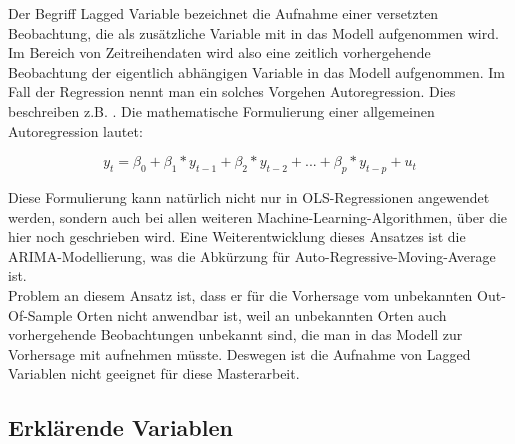 \documentclass[a4paper,12pt]{thesis}
\begin{document}
Der Begriff Lagged Variable bezeichnet die Aufnahme einer versetzten Beobachtung, die als zusätzliche Variable mit in das Modell aufgenommen wird. Im Bereich von Zeitreihendaten wird also eine zeitlich vorhergehende Beobachtung der eigentlich abhängigen Variable in das Modell aufgenommen. Im Fall der Regression nennt man ein solches Vorgehen Autoregression. Dies beschreiben z.B. \cite{Stock2015a}. Die mathematische Formulierung einer allgemeinen Autoregression lautet:

\begin{equation}
	\label{SVM:Autoregression}
	y_t = \beta_0 + \beta_1 * y_{t-1} + \beta_2 * y_{t-2} + ... + \beta_p * y_{t-p} + u_t
\end{equation}

Diese Formulierung kann natürlich nicht nur in OLS-Regressionen angewendet werden, sondern auch bei allen weiteren Machine-Learning-Algorithmen, über die hier noch geschrieben wird. Eine Weiterentwicklung dieses Ansatzes ist die ARIMA-Modellierung, was die Abkürzung für Auto-Regressive-Moving-Average ist.\\
Problem an diesem Ansatz ist, dass er für die Vorhersage vom unbekannten Out-Of-Sample Orten nicht anwendbar ist, weil an unbekannten Orten auch vorhergehende Beobachtungen unbekannt sind, die man in das Modell zur Vorhersage mit aufnehmen müsste. Deswegen ist die Aufnahme von Lagged Variablen nicht geeignet für diese Masterarbeit.

\subsection{Erklärende Variablen}
\end{document}
